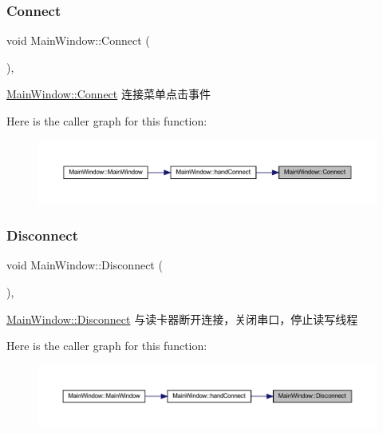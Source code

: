 \subsubsection{\texorpdfstring{Connect}{Connect}}
{\footnotesize\ttfamily void Main\+Window\+::\+Connect (\begin{DoxyParamCaption}{ }\end{DoxyParamCaption})\hspace{0.3cm}{\ttfamily [private]}, {\ttfamily [slot]}}



\mbox{\hyperlink{class_main_window_a24ffccc8ae4041a33faa25844a3db1f8}{Main\+Window\+::\+Connect}} 连接菜单点击事件 

Here is the caller graph for this function\+:
\nopagebreak
\begin{figure}[H]
\begin{center}
\leavevmode
\includegraphics[width=350pt]{class_main_window_a24ffccc8ae4041a33faa25844a3db1f8_icgraph}
\end{center}
\end{figure}
\mbox{\label{class_main_window_a4c998ea4be4f3f4ead67e5af459b89de}} 
\subsubsection{\texorpdfstring{Disconnect}{Disconnect}}
{\footnotesize\ttfamily void Main\+Window\+::\+Disconnect (\begin{DoxyParamCaption}{ }\end{DoxyParamCaption})\hspace{0.3cm}{\ttfamily [private]}, {\ttfamily [slot]}}



\mbox{\hyperlink{class_main_window_a4c998ea4be4f3f4ead67e5af459b89de}{Main\+Window\+::\+Disconnect}} 与读卡器断开连接，关闭串口，停止读写线程 

Here is the caller graph for this function\+:
\nopagebreak
\begin{figure}[H]
\begin{center}
\leavevmode
\includegraphics[width=350pt]{class_main_window_a4c998ea4be4f3f4ead67e5af459b89de_icgraph}
\end{center}
\end{figure}
\mbox{\label{class_main_window_a45f9088074a2cb76009c6a7f047fbace}} 
